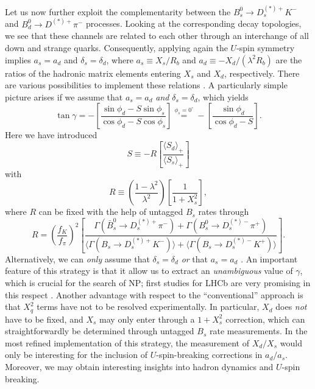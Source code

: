 \documentclass[11pt]{cernrep}
\begin{document}
Let us now further exploit the complementarity between the 
$B_s^0\to D_s^{(\ast)+}K^-$ and $B_d^0\to D^{(\ast)+}\pi^-$ processes.
Looking at the corresponding decay topologies, we see that
these channels are related to each other through an interchange of 
all down and strange quarks. Consequently, applying again the $U$-spin 
symmetry implies $a_s=a_d$ and $\delta_s=\delta_d$, where $a_s\equiv X_s/R_b$ 
and $a_d\equiv -X_d/(\lambda^2 R_b)$ are the ratios of the hadronic matrix elements 
entering $X_s$ and $X_d$, respectively. There are various possibilities 
to implement these relations \cite{RF-gam-ca}. A particularly simple
picture arises if we assume that $a_s=a_d$ {\it and} $\delta_s=\delta_d$, 
which yields
\begin{equation}
\tan\gamma=-\left[\frac{\sin\phi_d-S
\sin\phi_s}{\cos\phi_d-S\cos\phi_s}
\right]\stackrel{\phi_s=0^\circ}{=}
-\left[\frac{\sin\phi_d}{\cos\phi_d-S}\right].
\end{equation}
Here we have introduced
\begin{equation}
S\equiv-R\left[\frac{\langle S_d\rangle_+}{\langle S_s\rangle_+}\right]
\end{equation}
with
\begin{equation}
R\equiv\left(\frac{1-\lambda^2}{\lambda^2}\right)
\left[\frac{1}{1+X_s^2}\right],
\end{equation}
where $R$ can be fixed with the help of untagged $B_s$ rates through
\begin{equation}
R=\left(\frac{f_K}{f_\pi}\right)^2 \left[
\frac{\Gamma(\bar B^0_s \to D_s^{(\ast)+}\pi^-)+
\Gamma(B^0_s\to D_s^{(\ast)-}\pi^+)}{\langle\Gamma(B_s\to D_s^{(\ast)+}K^-)
\rangle+\langle\Gamma(B_s\to D_s^{(\ast)-}K^+)\rangle}\right].
\end{equation}
Alternatively, we can {\it only} assume that $\delta_s=\delta_d$ {\it or} 
that $a_s=a_d$ \cite{RF-gam-ca}. An important feature of this strategy
is that it allow us to extract an {\it unambiguous} value of $\gamma$, 
which is crucial for the search of NP; first studies for LHCb are very promising 
in this respect \cite{wilkinson-CKM}.
Another advantage with respect to the ``conventional'' approach is that 
$X_q^2$ terms have not to be resolved experimentally. In 
particular, $X_d$ does {\it not} have to be fixed, and $X_s$ may only enter 
through a $1+X_s^2$ correction, which can straightforwardly be determined 
through untagged $B_s$ rate measurements. In the most refined implementation 
of this strategy, the measurement of $X_d/X_s$ would only be interesting for 
the inclusion of $U$-spin-breaking corrections in $a_d/a_s$. Moreover, we may 
obtain interesting insights into hadron dynamics and $U$-spin breaking. 
\end{document}
